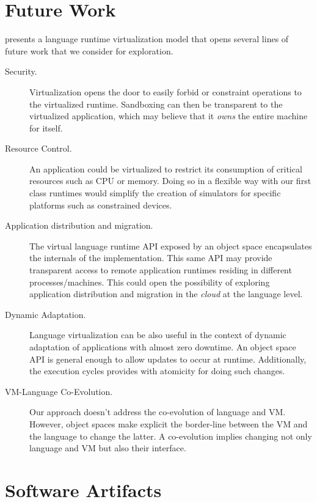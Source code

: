 \section{Future Work}

\Vtt presents a language runtime virtualization model that opens several lines of future work that we consider for exploration.

\begin{description}

\item[Security.] Virtualization opens the door to easily forbid or constraint operations to the virtualized runtime. Sandboxing can then be transparent to the virtualized application, which may believe that it \emph{owns} the entire machine for itself.

\item[Resource Control.] An application could be virtualized to restrict its consumption of critical resources such as CPU or memory. Doing so in a flexible way with our first class runtimes would simplify \eg the creation of simulators for specific platforms such as constrained devices.

\item[Application distribution and migration.] The virtual language runtime API exposed by an object space encapsulates the internals of the implementation. This same API may provide transparent access to remote application runtimes residing in different processes/machines. This could open the possibility of exploring application distribution and migration in the \emph{cloud} at the language level.

\item[Dynamic Adaptation.] Language virtualization can be also useful in the context of dynamic adaptation of applications with almost zero downtime. An object space API is general enough to allow updates to occur at runtime. Additionally, the execution cycles provides with atomicity for doing such changes.

\item[VM-Language Co-Evolution.] Our approach doesn't address the co-evolution of language and VM. However, object spaces make explicit the border-line between the VM and the language to change the latter. A co-evolution implies changing not only language and VM but also their interface.

\end{description}

\section{Software Artifacts}


